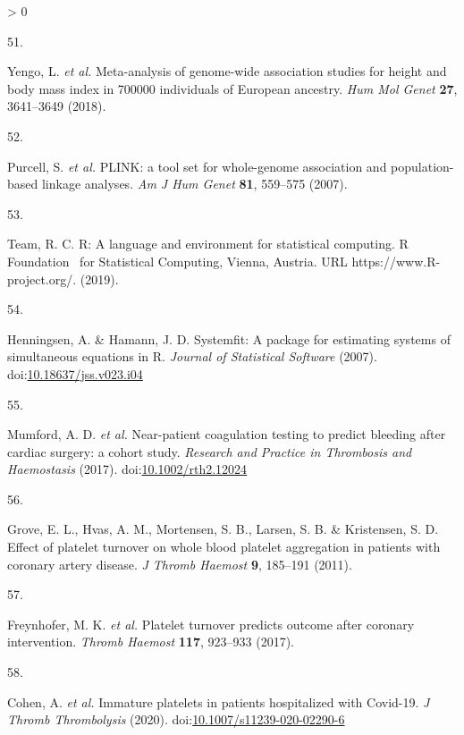 \documentclass[11pt,twoside]{bristolthesis}
\newlength{\cslhangindent}
\newlength{\csllabelwidth}
\newenvironment{CSLReferences}[2] %
 {%
  \setlength{\parindent}{0pt}
  \ifodd #1 \everypar{\setlength{\hangindent}{\cslhangindent}}\ignorespaces\fi
  \ifnum #2 > 0
  \setlength{\parskip}{#2\baselineskip}
  \fi
 }%
 {}
\newcommand{\CSLLeftMargin}[1]{\parbox[t]{\csllabelwidth}{#1}}
\newcommand{\CSLRightInline}[1]{\parbox[t]{\linewidth - \csllabelwidth}{#1}\break}
\begin{document}
\begin{CSLReferences}{0}{0}
\leavevmode\hypertarget{ref-Yengo2018}{}%
\CSLLeftMargin{51. }
\CSLRightInline{Yengo, L. \emph{et al.} {Meta-analysis of genome-wide association studies for height and body mass index in 700000 individuals of European ancestry}. \emph{Hum Mol Genet} \textbf{27}, 3641--3649 (2018).}

\leavevmode\hypertarget{ref-Purcell2007a}{}%
\CSLLeftMargin{52. }
\CSLRightInline{Purcell, S. \emph{et al.} {PLINK: a tool set for whole-genome association and population-based linkage analyses}. \emph{Am J Hum Genet} \textbf{81}, 559--575 (2007).}

\leavevmode\hypertarget{ref-Team2019a}{}%
\CSLLeftMargin{53. }
\CSLRightInline{Team, R. C. {R: A language and environment for statistical computing. R Foundation~ for Statistical Computing, Vienna, Austria. URL https://www.R-project.org/.} (2019).}

\leavevmode\hypertarget{ref-Henningsen2007}{}%
\CSLLeftMargin{54. }
\CSLRightInline{Henningsen, A. \& Hamann, J. D. {Systemfit: A package for estimating systems of simultaneous equations in R}. \emph{Journal of Statistical Software} (2007). doi:\href{https://doi.org/10.18637/jss.v023.i04}{10.18637/jss.v023.i04}}

\leavevmode\hypertarget{ref-Mumford2017}{}%
\CSLLeftMargin{55. }
\CSLRightInline{Mumford, A. D. \emph{et al.} {Near-patient coagulation testing to predict bleeding after cardiac surgery: a cohort study}. \emph{Research and Practice in Thrombosis and Haemostasis} (2017). doi:\href{https://doi.org/10.1002/rth2.12024}{10.1002/rth2.12024}}

\leavevmode\hypertarget{ref-Grove2011a}{}%
\CSLLeftMargin{56. }
\CSLRightInline{Grove, E. L., Hvas, A. M., Mortensen, S. B., Larsen, S. B. \& Kristensen, S. D. {Effect of platelet turnover on whole blood platelet aggregation in patients with coronary artery disease}. \emph{J Thromb Haemost} \textbf{9}, 185--191 (2011).}

\leavevmode\hypertarget{ref-Freynhofer2017a}{}%
\CSLLeftMargin{57. }
\CSLRightInline{Freynhofer, M. K. \emph{et al.} {Platelet turnover predicts outcome after coronary intervention}. \emph{Thromb Haemost} \textbf{117}, 923--933 (2017).}

\leavevmode\hypertarget{ref-Cohen2020}{}%
\CSLLeftMargin{58. }
\CSLRightInline{Cohen, A. \emph{et al.} {Immature platelets in patients hospitalized with Covid-19}. \emph{J Thromb Thrombolysis} (2020). doi:\href{https://doi.org/10.1007/s11239-020-02290-6}{10.1007/s11239-020-02290-6}}


\end{CSLReferences}
\end{document}
